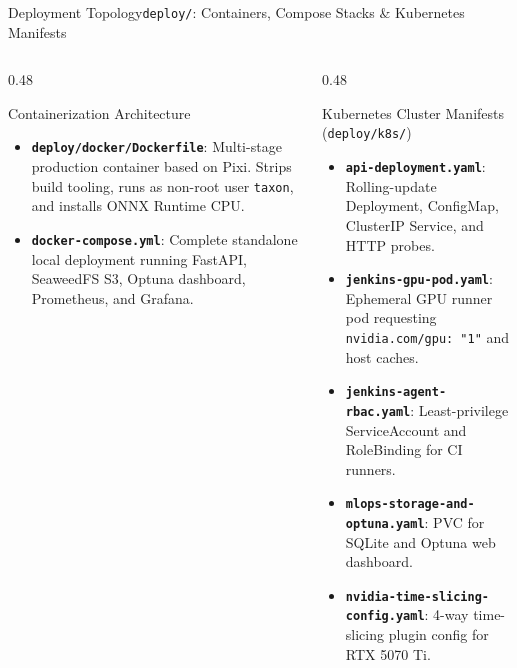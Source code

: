 \begin{frame}{Deployment Topology}{\texttt{deploy/}: Containers, Compose Stacks \& Kubernetes Manifests}
    \begin{columns}[T]
        \begin{column}{0.48\textwidth}
            \begin{block}{Containerization Architecture}
                \begin{itemize}\scriptsize
                    \item \textbf{\texttt{deploy/docker/Dockerfile}}: Multi-stage production container based on Pixi. Strips build tooling, runs as non-root user \texttt{taxon}, and installs ONNX Runtime CPU.
                    \item \textbf{\texttt{docker-compose.yml}}: Complete standalone local deployment running FastAPI, SeaweedFS S3, Optuna dashboard, Prometheus, and Grafana.
                \end{itemize}
            \end{block}
        \end{column}
        \begin{column}{0.48\textwidth}
            \begin{block}{Kubernetes Cluster Manifests (\texttt{deploy/k8s/})}
                \begin{itemize}\scriptsize
                    \item \textbf{\texttt{api-deployment.yaml}}: Rolling-update Deployment, ConfigMap, ClusterIP Service, and HTTP probes.
                    \item \textbf{\texttt{jenkins-gpu-pod.yaml}}: Ephemeral GPU runner pod requesting \texttt{nvidia.com/gpu: "1"} and host caches.
                    \item \textbf{\texttt{jenkins-agent-rbac.yaml}}: Least-privilege ServiceAccount and RoleBinding for CI runners.
                    \item \textbf{\texttt{mlops-storage-and-optuna.yaml}}: PVC for SQLite and Optuna web dashboard.
                    \item \textbf{\texttt{nvidia-time-slicing-config.yaml}}: 4-way time-slicing plugin config for RTX 5070 Ti.
                \end{itemize}
            \end{block}
        \end{column}
    \end{columns}

\end{frame}

